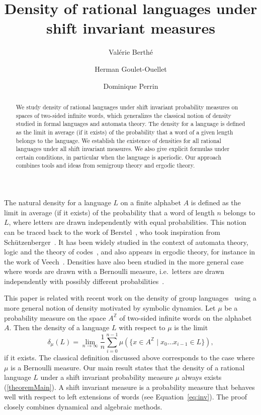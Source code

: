 \documentclass[a4paper,UKenglish,numberwithinsect,cleveref]{lipics-v2021}
\title{Density of rational languages under shift invariant measures}
\author{Valérie Berthé}{Université Paris Cité, IRIF, CNRS}{berthe@irif.fr}{https://orcid.org/0000-0001-5561-7882}{}
\author{Herman Goulet-Ouellet}{Faculty of Information Technology, Czech Technical University in Prague}{herman.goulet.ouellet@fit.cvut.cz}{https://orcid.org/0000-0003-3445-8469}{The second author was supported by the CTU Global Postdoc Fellowship program.}
\author{Dominique Perrin}{LIGM, Université Gustave Eiffel}{dominique.perrin@esiee.fr}{https://orcid.org/0000-0003-4036-141X}{}
\newcommand{\Z}{\mathbb{Z}}
\begin{document}
\maketitle

\begin{abstract}
    We study density of rational languages under shift invariant probability measures on spaces of two-sided infinite words, which generalizes the classical notion of density studied in formal languages and automata theory.  The density for a language  is  defined as the limit in average (if it exists) of the probability that a word of a given length  belongs to the language. We establish the existence of densities for all rational languages under all shift invariant measures. We also give explicit formulas under certain conditions, in particular when the language is aperiodic. Our approach combines tools and ideas from semigroup theory and ergodic theory.
\end{abstract}

The natural density for a language $L$ on a finite alphabet $A$ is  defined as the limit
in average (if it exists) of the probability that a word of length $n$ belongs to $L$,
where letters are drawn independently with equal probabilities. This notion can be traced
back to the work of Berstel~\cite{Berstel1972}, who took inspiration from
Schützenberger~\cite{Schutzenberger1965}. It has been widely studied in the context of automata theory, logic and the theory of codes~\cite{BerstelPerrinReutenauer2009,book/Salomaa1978,Lynch1993,Hansel1983,Hansel1989,Bodirsky2004,Sinya2015,Koga2019,Kozik2005}, and also appears in ergodic theory, for instance in the work of Veech~\cite{Veech1969,Veech1975}. Densities have also been studied in the more general case where words are drawn with a Bernoulli measure, i.e.\ letters are drawn independently with possibly different probabilities~\cite{BerstelPerrinReutenauer2009}.

This paper is related with recent work on the density of group languages~\cite{BertheGouletOuelletNybergBroddaPerrinPetersen2024} using a more general notion of density motivated by symbolic dynamics. Let $\mu$ be a probability measure on the space $A^\Z$ of two-sided infinite words on the alphabet $A$. Then the density of a language $L$ with respect to $\mu$ is the limit
\begin{equation}
    \delta_\mu(L)=\lim_{n\to\infty}\frac{1}{n}\sum_{i=0}^{n-1}\mu(\{x\in A^\Z \mid x_0\dots x_{i-1}\in L\}),\label{eqDefinitionDensity}
\end{equation}
if it exists. The classical definition  discussed above corresponds to the case where $\mu$ is a Bernoulli measure. Our main result states that the density of a rational language $L$ under a shift invariant probability measure $\mu$ always exists (\cref{theoremMain}). A shift invariant measure  is a probability measure that behaves well with respect to left extensions of words (see Equation~\eqref{eq:inv}). The proof closely combines dynamical and algebraic methods. 
 
\end{document}
